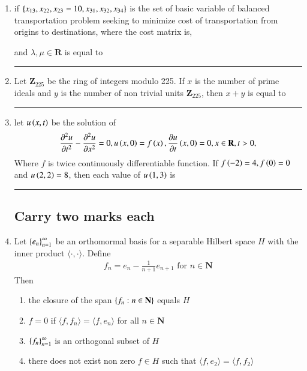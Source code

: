 \documentclass[journal]{IEEEtran}
\numberwithin{equation}{enumi}
\numberwithin{figure}{enumi}
\begin{document}
\begin{enumerate}
		\item 
		if $\left\{x_{13}, x_{22}, x_{23} = 10, x_{31}, x_{32}, x_{34}\right\}$ is the set of basic variable of  balanced transportation problem seeking to minimize cost of transportation from origins to destinations, where the cost matrix is, 
		\begin{table}
			\centering
			
		\end{table}
		and $\lambda, \mu \in \mathbf{R}$ is equal to \rule{2cm}{1pt}

		\item 
		Let $\mathbf{Z}_{225}$ be the ring of integers modulo 225. If $x$ is the number of prime ideals and $y$ is the number of non trivial units $\mathbf{Z}_{225}$, then $x + y$ is equal to \rule{2cm}{0.1pt}

		\item 
		let $u\left(x,t\right)$ be the solution of
		\begin{align*}
		\frac{\partial^2 u}{\partial t^2} - \frac{\partial^2 u}{\partial x^2} = 0, u\left(x,0\right) = f\left(x\right), \frac{\partial u}{\partial t}\left(x,0\right) = 0, x\in \mathbf{R}, t > 0,
		\end{align*}
		Where $f$ is twice continuously differentiable function. If $f\left(-2\right) = 4, f\left(0\right) = 0$ and $u\left(2,2\right) = 8$, then each value of $u\left(1,3\right)$ is \rule{2cm}{0.1pt}

\subsection{Carry two marks each}
		\item 
		Let $\left\{e_n\right\}_{n = 1}^{\infty}$ be an orthomormal basis for a separable Hilbert space $H$ with the inner product $\langle \cdot, \cdot \rangle$. Define 
		\begin{align*}
			f_n = e_n - \frac{1}{n + 1}e_{n + 1} \text{ for } n \in \mathbf{N}
		\end{align*}
		Then 
		\begin{enumerate}
			\item the closure of the span $\left\{f_n : n \in \mathbf{N}\right\}$ equals $H$
			\item $f = 0$ if $\langle{f}, f_n \rangle = \langle f, e_n \rangle$ for all $ n \in \mathbf{N}$
			\item $\left\{f_n\right\}_{n = 1}^{\infty}$ is an orthogonal subset of $H$
			\item there does not exist non zero $f \in H$ such that $\langle f , e_2\rangle = \langle{f}, f_2\rangle$
		\end{enumerate}


\end{enumerate}
\end{document}
